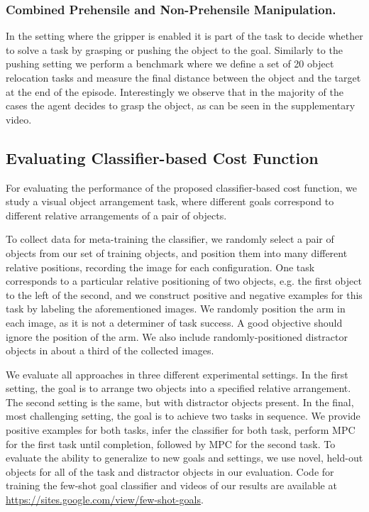 \subsubsection{Combined Prehensile and Non-Prehensile Manipulation.}


In the setting where the gripper is enabled it is part of the task to decide whether to solve a task by grasping or pushing the object to the goal. Similarly to the pushing setting we perform a benchmark where we define a set of 20 object relocation tasks and measure the final distance between the object and the target at the end of the episode. Interestingly we observe that in the majority of the cases the agent decides to grasp the object, as can be seen in the supplementary video.

\subsection{Evaluating Classifier-based Cost Function}

For evaluating the performance of the proposed classifier-based cost function, we study a visual object arrangement task, where different goals correspond to different relative arrangements of a pair of objects. 


To collect data for meta-training the classifier, we randomly select a pair of objects from our set of training objects, and position them into many different relative positions, recording the image for each configuration. One task corresponds to a particular relative positioning of two objects, e.g. the first object to the left of the second, and we construct positive and negative examples for this task by labeling the aforementioned images. We randomly position the arm in each image, as it is not a determiner of task success. A good objective should ignore the position of the arm. We also include randomly-positioned distractor objects in about a third of the collected images.

We evaluate all approaches in three different experimental settings. In the first setting, the goal is to arrange two objects into a specified relative arrangement. The second setting is the same, but with distractor objects present. In the final, most challenging setting, the goal is to achieve two tasks in sequence. We provide positive examples for both tasks, infer the classifier for both task, perform MPC for the first task until completion, followed by MPC for the second task. To evaluate the ability to generalize to new goals and settings, we use novel, held-out objects for all of the task and distractor objects in our evaluation. Code for training the few-shot goal classifier and videos of our results are available at \url{https://sites.google.com/view/few-shot-goals}.

